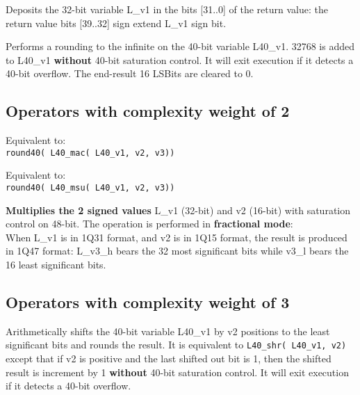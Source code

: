 Deposits the 32-bit variable L\_v1 in the bits [31..0] of the
return value: the return value bits [39..32] sign extend L\_v1
sign bit.


Performs a rounding to the infinite on the 40-bit variable
L40\_v1. 32768 is added to L40\_v1 \textbf{without} 40-bit saturation
control. It will exit execution if it detects a 40-bit overflow.  The
end-result 16 LSBits are cleared to 0.


\subsection{Operators with complexity weight of 2}


Equivalent to: \\
{\tt round40( L40\_mac( L40\_v1, v2, v3)) }


Equivalent to: \\
{\tt round40( L40\_msu( L40\_v1, v2, v3)) }


\textbf{Multiplies the 2 signed values} L\_v1 (32-bit) and v2 (16-bit)
with saturation control on 48-bit. The operation is performed in
\textbf{fractional mode}: \\
When L\_v1 is in 1Q31 format, and v2 is in 1Q15 format, the result is
produced in 1Q47 format: L\_v3\_h bears the 32 most significant bits
while v3\_l bears the 16 least significant bits.

\subsection{Operators with complexity weight of 3}


Arithmetically shifts the 40-bit variable L40\_v1 by v2 positions to
the least significant bits and rounds the result. It is equivalent to
{\tt L40\_shr( L40\_v1, v2)} except that if v2 is positive and the last
shifted out bit is 1, then the shifted result is increment by 1
\textbf{without} 40-bit saturation control. It will exit execution if
it detects a 40-bit overflow.

